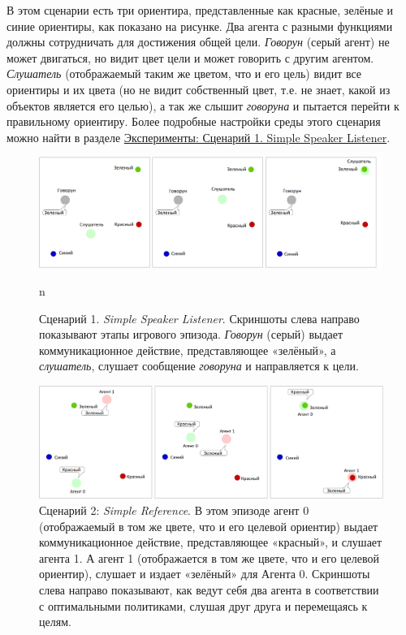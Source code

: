 В этом сценарии есть три ориентира, представленные как красные, зелёные и синие ориентиры, как показано на рисунке. Два агента с разными функциями должны сотрудничать для достижения общей цели. \textit{Говорун} (серый агент) не может двигаться, но видит цвет цели и может говорить с другим агентом. \textit{Слушатель} (отображаемый таким же цветом, что и его цель) видит все ориентиры и их цвета (но не видит собственный цвет, т.е. не знает, какой из объектов является его целью), а так же слышит \textit{говоруна} и пытается перейти к правильному ориентиру. Более подробные настройки среды этого сценария можно найти в разделе \hyperref[exp-ssl]{Эксперименты: Сценарий 1. Simple Speaker Listener}.

\begin{figure}[ht!] 
	\center
	\includegraphics [scale=0.41] {my_folder/images/intro/ssl.png}
	\caption{Сценарий 1. \textit{Simple Speaker Listener}. Скриншоты слева направо показывают этапы игрового эпизода. \textit{Говорун} (серый) выдает коммуникационное действие, представляющее «зелёный», а \textit{слушатель}, слушает сообщение \textit{говоруна} и направляется к цели.}
n	\label{fig-intro-ssl}
\end{figure}

\begin{figure}[ht!] 
	\center
	\includegraphics [scale=0.38] {my_folder/images/intro/sr.png}
	\caption{Сценарий 2: \textit{Simple Reference}. В этом эпизоде агент 0 (отображаемый в том же цвете, что и его целевой ориентир) выдает коммуникационное действие, представляющее «красный», и слушает агента 1. А агент 1 (отображается в том же цвете, что и его целевой ориентир), слушает и издает «зелёный» для Агента 0. Скриншоты слева направо показывают, как ведут себя два агента в соответствии с оптимальными политиками, слушая друг друга и перемещаясь к целям.}
	\label{fig-intro-sr}
\end{figure}

